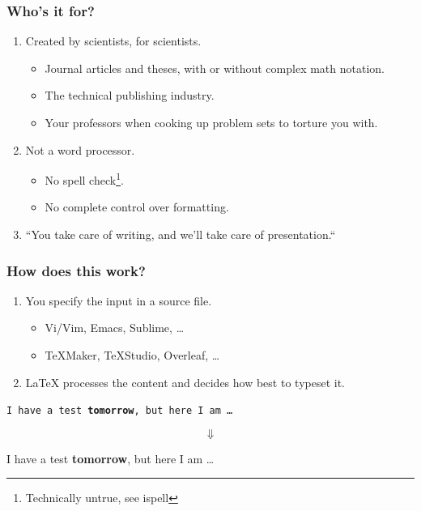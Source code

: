 \documentclass{beamer}
\begin{document}
\begin{frame}
    \frametitle{Who's it for?}
    \begin{enumerate}
        \item<1-> Created by scientists, for scientists.
            \begin{itemize}
                \item Journal articles and theses, with or without complex
                    math notation.
                \item The technical publishing industry.
                \item Your professors when cooking up problem sets to torture
                    you with.
            \end{itemize}
        \item<2-> Not a word processor.
            \begin{itemize}
                \item No spell check\footnote{Technically untrue, see
                        ispell}.
                \item No complete control over formatting.
            \end{itemize}
        \item<3-> ``You take care of writing, and we'll take care of
            presentation.``
    \end{enumerate}
\end{frame}

\begin{frame}
    \frametitle{How does this work?}
    \begin{enumerate}
        \item You specify the input in a source file.
            \begin{itemize}
                \item Vi/Vim, Emacs, Sublime, \dots
                \item TeXMaker, TeXStudio, Overleaf, \dots
            \end{itemize}
        \item LaTeX processes the content and decides how best to typeset it.
    \end{enumerate}
    \vspace{0.5cm}
    \begin{framed}
        \texttt{I have a test \textbf{tomorrow}, but here I
            am \dots}
    \end{framed}
    \[
        \Downarrow
    \]
    \begin{framed}
        I have a test \textbf{tomorrow}, but here I am \dots
    \end{framed}
\end{frame}
\end{document}
